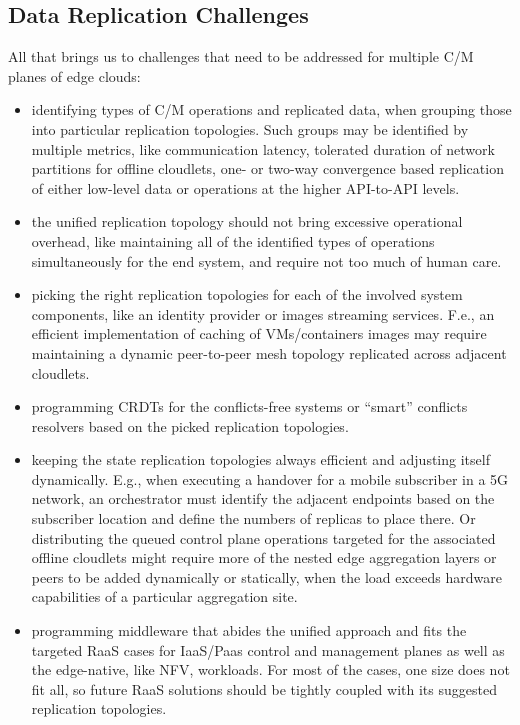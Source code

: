 \documentclass[conference]{IEEEtran}
\begin{document}
\subsection{Data Replication Challenges}
All that brings us to challenges that need to be addressed for multiple C/M
planes of edge clouds:
\begin{itemize}
  \item identifying types of C/M operations and replicated
    data, when grouping those into particular replication topologies. Such
    groups may be identified by multiple metrics, like communication latency,
    tolerated duration of network partitions for offline cloudlets, one- or
    two-way convergence based replication of either low-level data or
    operations at the higher API-to-API levels.
  \item the unified replication topology should not bring excessive operational
    overhead, like maintaining all of the identified types of operations
    simultaneously for the end system, and require not too much of human care.
  \item picking the right replication topologies for each of the involved
    system components, like an identity provider or images streaming services.
    F.e., an efficient implementation of caching of VMs/containers images may
    require maintaining a dynamic peer-to-peer mesh topology replicated across
    adjacent cloudlets.
  \item programming CRDTs for the conflicts-free systems or ``smart'' conflicts
    resolvers based on the picked replication topologies.
  \item keeping the state replication topologies always efficient and adjusting
    itself dynamically. E.g., when executing a handover for a mobile subscriber
    in a 5G network, an orchestrator must identify the adjacent endpoints based
    on the subscriber location and define the numbers of replicas to place
    there. Or distributing the queued control plane operations targeted for the
    associated offline cloudlets might require more of the nested edge
    aggregation layers or peers to be added dynamically or statically, when the
    load exceeds hardware capabilities of a particular aggregation site.
  \item programming middleware that abides the unified approach and fits the
    targeted RaaS cases for IaaS/Paas control and management planes as well as
    the edge-native, like NFV, workloads. For most of the cases, one size
    does not fit all, so future RaaS solutions should be tightly coupled with
    its suggested replication topologies.
\end{itemize}
\end{document}

